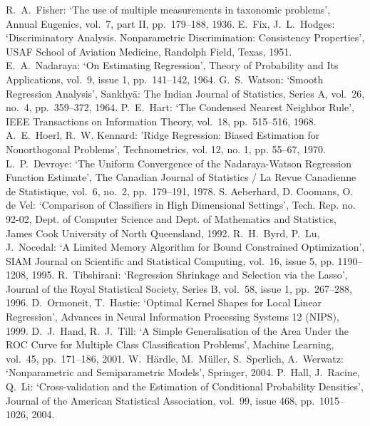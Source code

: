 \cleardoublepage
{}
{}
\begin{thebibliography}{99}
R.\ A.\ Fisher: `The use of multiple measurements in taxonomic problems', Annual Eugenics, vol.\ 7, part II, pp.\ 179--188, 1936.
%
E.\ Fix, J.\ L.\ Hodges: `Discriminatory Analysis. Nonparametric Discrimination: Consistency Properties', USAF School of Aviation Medicine, Randolph Field, Texas, 1951.
%
E.\ A.\ Nadaraya: `On Estimating Regression', Theory of Probability and Its Applications, vol.\ 9, issue 1, pp.\ 141--142, 1964.
%
G.\ S.\ Watson: `Smooth Regression Analysis', Sankhyā: The Indian Journal of Statistics, Series A, vol.\ 26, no.\ 4, pp.\ 359--372, 1964.
%
P.\ E.\ Hart: `The Condensed Nearest Neighbor Rule', IEEE Transactions on Information Theory, vol.\ 18, pp.\ 515–516, 1968.
%
A.\ E.\ Hoerl, R.\ W. Kennard: 'Ridge Regression: Biased Estimation for Nonorthogonal Problems', Technometrics, vol. 12, no. 1, pp. 55--67, 1970.
%
L.\ P.\ Devroye: `The Uniform Convergence of the Nadaraya-Watson Regression Function Estimate', The Canadian Journal of Statistics / La Revue Canadienne de Statistique, vol.\ 6, no.\ 2, pp.\ 179--191, 1978.
%
S. Aeberhard, D. Coomans, O. de Vel: `Comparison of Classifiers in High Dimensional Settings', Tech. Rep. no. 92-02, Dept. of Computer Science and Dept. of Mathematics and Statistics, James Cook University of North Queensland, 1992. 
%
R.\ H.\ Byrd, P.\ Lu, J.\ Nocedal: `A Limited Memory Algorithm for Bound Constrained Optimization', SIAM Journal on Scientific and Statistical Computing, vol.\ 16, issue 5, pp. 1190--1208, 1995.
%
R.\ Tibshirani: `Regression Shrinkage and Selection via the Lasso', Journal of the Royal Statistical Society, Series B, vol.\ 58, issue 1, pp.\ 267--288, 1996.
%
D.\ Ormoneit, T.\ Hastie: `Optimal Kernel Shapes for Local Linear Regression', Advances in Neural Information Processing Systems 12 (NIPS), 1999.
%
D.\ J.\ Hand, R.\ J.\ Till: `A Simple Generalisation of the Area Under the ROC Curve for Multiple Class Classification Problems', Machine Learning, vol.\ 45, pp.\ 171--186, 2001.
%
W.\ Härdle, M.\ Müller, S.\ Sperlich, A.\ Werwatz: `Nonparametric and Semiparametric Models', Springer, 2004.
%
P.\ Hall, J.\ Racine, Q.\ Li: `Cross-validation and the Estimation of Conditional Probability Densities', Journal of the American Statistical Association, vol.\ 99, issue 468, pp.\ 1015--1026, 2004.

\end{thebibliography}

